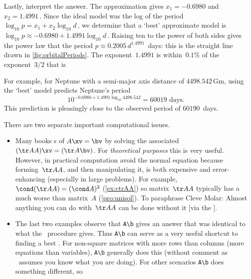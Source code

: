 \begin{example}
\begin{solution}
Lastly, interpret the answer.
The approximation gives \(x_1=-0.6980\) and \(x_2=1.4991\)\,.  
Since the ideal model was the log of the period \(\log_{10}p=x_1+x_2\log_{10}d\)\,, we determine that a `best' approximate model is \(\log_{10}p\approx-0.6980+1.4991\log_{10}d\)\,. 
Raising ten to the power of both sides gives the power law that the period \(p\approx0.2005\,d^{1.4991}\)~days: this is the straight line drawn in \cref{fig:orbitalPeriods}.
The exponent~\(1.4991\) is within~\(0.1\)\% of the exponent~\(3/2\) that is 

For example, for Neptune with a semi-major axis distance of \(4498.542\)\,Gm, using the `best' model predicts Neptune's period\[10^{-0.6980+1.4991\log_{10}4498.542}=60019\text{ days.}\]
This prediction is pleasingly close to the observed period of \(60190\)~days.
\end{solution}
\end{example}





\begin{compute}
There are two separate important computational issues.
\begin{itemize}
\item Many books s of \(A\xv=\bv\) by solving the associated  \((\tr AA)\xv=(\tr A\bv)\).  
For \emph{theoretical purposes} this  is very useful.  
However, in practical computation avoid the normal equation because forming~\(\tr AA\), and then manipulating it, is both expensive and error-enhancing (especially in large problems).
For example, \(\cond(\tr AA)=(\cond A)^2\) (\cref{ex:ctrAA}) so matrix~\(\tr AA\) typically has a much worse  than matrix~\(A\) (\cref{pro:unisol}).
To paraphrase Cleve Molar: Almost anything you can do with~\(\tr AA\) can be done without it [via the \svd].


\item The last two examples observe that \verb|A\b| gives an answer that was identical to what the \svd\ procedure gives.
Thus \verb|A\b| can serve as a very useful shortcut to finding a best .
For non-square matrices with more rows than columns (more equations than variables), \verb|A\b| generally does this (without comment as \script\ assumes you know what you are doing).
For other scenarios \verb|A\b| does something different, so 
\end{itemize}
\end{compute}



